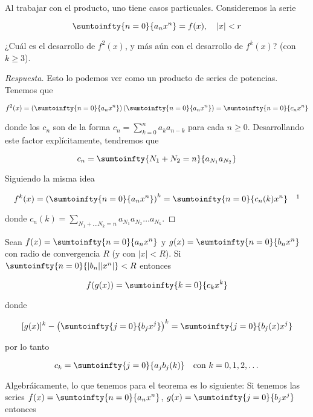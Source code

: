 Al trabajar con el producto, uno tiene casos particuales. Consideremos la serie

\[
\sumtoinfty{n=0}{a_nx^n} = f(x), \quad |x|<r
\]

\begin{pre}
    ¿Cuál es el desarrollo de $f^2(x)$, y más aún con el desarrollo de $f^k(x)$? (con $k \geq 3$).
\end{pre}

\begin{proof}[Respuesta]
    Esto lo podemos ver como un producto de series de potencias. Tenemos que
    
    \[
    f^2(x) = \left(\sumtoinfty{n=0}{a_nx^n}\right)\left(\sumtoinfty{n=0}{a_nx^n}\right) = \sumtoinfty{n=0}{c_nx^n}
    \]
    
    \noindent donde los $c_n$ son de la forma $c_n = \sum_{k=0}^n a_k a_{n-k}$ para cada $n \geq 0$. Desarrollando este factor explícitamente, tendremos que
    
    \[
    c_n = \sumtoinfty{N_1 + N_2 = n}{a_{N_1}a_{N_2}}
    \]
    
    Siguiendo la misma idea
    
    \[
    f^k(x) = \left(\sumtoinfty{n=0}{a_nx^n}\right)^k = \sumtoinfty{n=0}{c_n(k)x^n} \quad \footnotemark
    \]
    
    \noindent donde $c_n(k) = \sum_{N_1 + \dots N_k = n} a_{N_1}a_{N_2} \dots a_{N_k}$.
\end{proof}

\begin{teo}[Sustitución]
    Sean $f(x) = \sumtoinfty{n=0}{a_nx^n}$ y $g(x) = \sumtoinfty{n=0}{b_nx^n}$ con radio de convergencia $R$ (y con $|x|<R$). Si $\sumtoinfty{n=0}{|b_n||x^n|}<R$ entonces
    
    \[
    f(g(x)) = \sumtoinfty{k=0}{c_kx^k}
    \]
    
    \noindent donde 
    
    \[
    [g(x)]^k - \left( \sumtoinfty{j=0}{b_jx^j} \right)^k = \sumtoinfty{j=0}{b_j(x)x^j}
    \]
    
    \noindent por lo tanto
    
    \[
    c_k = \sumtoinfty{j=0}{a_jb_j(k)} \quad \text{con $k = 0, 1, 2, \dots$}
    \]
\end{teo}

Algebráicamente, lo que tenemos para el teorema es lo siguiente: Si tenemos las series $f(x) = \sumtoinfty{n=0}{a_nx^n}$, $g(x) = \sumtoinfty{j=0}{b_jx^j}$ entonces

